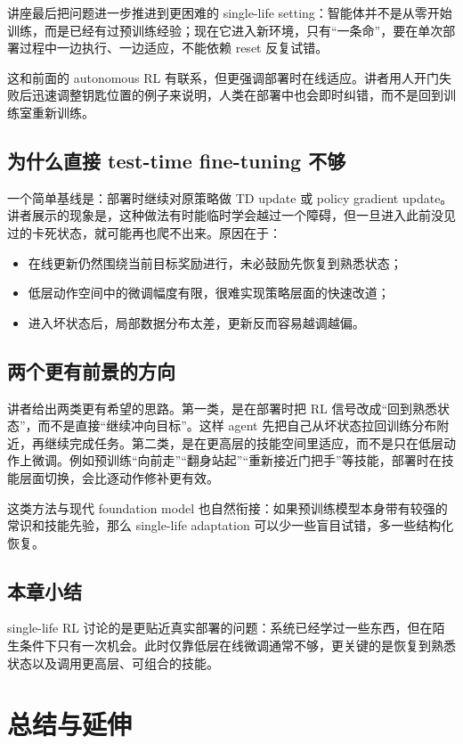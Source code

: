 \documentclass[a4paper]{article}
\begin{document}
讲座最后把问题进一步推进到更困难的 single-life setting：智能体并不是从零开始训练，而是已经有过预训练经验；现在它进入新环境，只有“一条命”，要在单次部署过程中一边执行、一边适应，不能依赖 reset 反复试错。

这和前面的 autonomous RL 有联系，但更强调部署时在线适应。讲者用人开门失败后迅速调整钥匙位置的例子来说明，人类在部署中也会即时纠错，而不是回到训练室重新训练。

\subsection{为什么直接 test-time fine-tuning 不够}

一个简单基线是：部署时继续对原策略做 TD update 或 policy gradient update。讲者展示的现象是，这种做法有时能临时学会越过一个障碍，但一旦进入此前没见过的卡死状态，就可能再也爬不出来。原因在于：
\begin{itemize}
\item 在线更新仍然围绕当前目标奖励进行，未必鼓励先恢复到熟悉状态；
\item 低层动作空间中的微调幅度有限，很难实现策略层面的快速改道；
\item 进入坏状态后，局部数据分布太差，更新反而容易越调越偏。
\end{itemize}

\subsection{两个更有前景的方向}

讲者给出两类更有希望的思路。第一类，是在部署时把 RL 信号改成“回到熟悉状态”，而不是直接“继续冲向目标”。这样 agent 先把自己从坏状态拉回训练分布附近，再继续完成任务。第二类，是在更高层的技能空间里适应，而不是只在低层动作上微调。例如预训练“向前走”“翻身站起”“重新接近门把手”等技能，部署时在技能层面切换，会比逐动作修补更有效。

这类方法与现代 foundation model 也自然衔接：如果预训练模型本身带有较强的常识和技能先验，那么 single-life adaptation 可以少一些盲目试错，多一些结构化恢复。

\subsection{本章小结}

single-life RL 讨论的是更贴近真实部署的问题：系统已经学过一些东西，但在陌生条件下只有一次机会。此时仅靠低层在线微调通常不够，更关键的是恢复到熟悉状态以及调用更高层、可组合的技能。

\section{总结与延伸}
\end{document}

